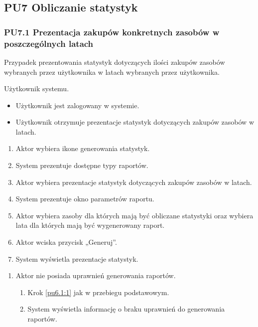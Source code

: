 \subsection{PU7 Obliczanie statystyk} \label{pu7}
\subsubsection{PU7.1 Prezentacja zakupów konkretnych zasobów w poszczególnych latach}
Przypadek prezentowania statystyk dotyczących ilości zakupów zasobów wybranych przez użytkownika w latach wybranych przez użytkownika.

Użytkownik systemu.

\begin{itemize}
\item Użytkownik jest zalogowany w systemie.
\end{itemize}

\begin{itemize}
\item Użytkownik otrzymuje prezentacje statystyk dotyczących zakupów zasobów w latach.
\end{itemize}

\begin{enumerate}
	\item \label{pu7.1:1} Aktor wybiera ikone generowania statystyk.
	\item System prezentuje dostępne typy raportów.
	\item \label{pu7.2:2} Aktor wybiera prezentacje statystyk dotyczących zakupów zasobów w latach.
	\item System prezentuje okno parametrów raportu.
	\item Aktor wybiera zasoby dla których mają być obliczane statystyki oraz wybiera lata dla których mają być wygenerowany raport.
	\item Aktor wciska przycisk „Generuj”.
	\item System wyświetla prezentacje statystyk.
\end{enumerate}

\begin{enumerate}
	\item Aktor nie posiada uprawnień generowania raportów.
	\begin{enumerate}[label*=\arabic*.]
		\item Krok \ref{pu6.1:1} jak w przebiegu podstawowym.
		\item System wyświetla informację o braku uprawnień do generowania raportów.
	\end{enumerate}
\end{enumerate}

